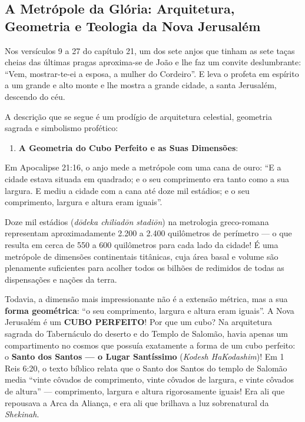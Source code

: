 \documentclass[11pt,a4paper,openany]{book}
\begin{document}
\subsection{A Metrópole da Glória: Arquitetura, Geometria e Teologia da Nova Jerusalém}


Nos versículos 9 a 27 do capítulo 21, um dos sete anjos que tinham as sete taças cheias das últimas pragas aproxima-se de João e lhe faz um convite deslumbrante: ``Vem, mostrar-te-ei a esposa, a mulher do Cordeiro''. E leva o profeta em espírito a um grande e alto monte e lhe mostra a grande cidade, a santa Jerusalém, descendo do céu.

A descrição que se segue é um prodígio de arquitetura celestial, geometria sagrada e simbolismo profético:

\begin{enumerate}
  \item \textbf{A Geometria do Cubo Perfeito e as Suas Dimensões}:
\end{enumerate}

Em Apocalipse 21:16, o anjo mede a metrópole com uma cana de ouro:
``E a cidade estava situada em quadrado; e o seu comprimento era tanto como a sua largura. E mediu a cidade com a cana até doze mil estádios; e o seu comprimento, largura e altura eram iguais''.

Doze mil estádios (\textit{dōdeka chiliadōn stadiōn}) na metrologia greco-romana representam aproximadamente 2.200 a 2.400 quilômetros de perímetro — o que resulta em cerca de 550 a 600 quilômetros para cada lado da cidade! É uma metrópole de dimensões continentais titânicas, cuja área basal e volume são plenamente suficientes para acolher todos os bilhões de redimidos de todas as dispensações e nações da terra.

Todavia, a dimensão mais impressionante não é a extensão métrica, mas a sua \textbf{forma geométrica}: ``o seu comprimento, largura e altura eram iguais''.
A Nova Jerusalém é um \textbf{CUBO PERFEITO}!
Por que um cubo?
Na arquitetura sagrada do Tabernáculo do deserto e do Templo de Salomão, havia apenas um compartimento no cosmos que possuía exatamente a forma de um cubo perfeito: o \textbf{Santo dos Santos — o Lugar Santíssimo} (\textit{Kodesh HaKodashim})!
Em 1 Reis 6:20, o texto bíblico relata que o Santo dos Santos do templo de Salomão media ``vinte côvados de comprimento, vinte côvados de largura, e vinte côvados de altura'' — comprimento, largura e altura rigorosamente iguais! Era ali que repousava a Arca da Aliança, e era ali que brilhava a luz sobrenatural da \textit{Shekinah}.
\end{document}
